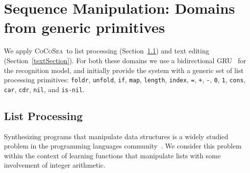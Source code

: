 \documentclass{article}
\newcommand{\system}{\textsc{CoCoSea}~}
\newcommand{\code}[1]{{\footnotesize\texttt{#1}}}
\begin{document}


\section{Sequence Manipulation: Domains from generic primitives}\label{sequences}
We apply \system to list processing (Section~\ref{listSection}) and text editing (Section~\ref{textSection}).
For both these domains we use a bidirectional GRU~\cite{cho2014learning} for
the recognition model, and initially provide the system with a generic set
of list processing primitives:
\code{foldr}, \code{unfold}, \code{if}, \code{map}, \code{length},
\code{index}, \code{=}, \code{+}, \code{-}, \code{0}, \code{1}, \code{cons},
\code{car}, \code{cdr}, \code{nil}, and \code{is-nil}.



\subsection{List Processing}\label{listSection}
Synthesizing programs that manipulate data structures is a widely studied
problem in the programming languages community~\cite{feser2015synthesizing}.
We consider this problem within the context of learning functions that
manipulate lists with some involvement of integer arithmetic.
\end{document}
